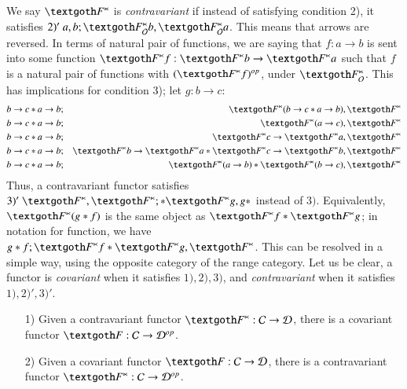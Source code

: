 \documentclass [12pt]{book}
\begin{document}
We say $\textgoth F^{\ltimes}$ is \textit{contravariant} if instead of satisfying condition 2), it satisfies $2)'~a,b;\textgoth F^\ltimes_{\mathcal O}b,\textgoth F^\ltimes_\mathcal Oa$. This means that arrows are reversed. In terms of natural pair of functions, we are saying that $f:a\rightarrow b$ is sent into some function $\textgoth F^\ltimes f:\textgoth F^\ltimes b\rightarrow\textgoth F^\ltimes a$ such that $f$ is a natural pair of functions with $(\textgoth F^\ltimes f)^{op}$, under $\textgoth F^\ltimes_\mathcal O$. This has implications for condition 3); let $g:b\rightarrow c$:\begin{eqnarray}\nonumber b\rightarrow c*a\rightarrow b&;&\textgoth F^\ltimes(b\rightarrow c*a\rightarrow b),\textgoth F^\ltimes\\\nonumber b\rightarrow c*a\rightarrow b&;&\textgoth F^\ltimes(a\rightarrow c),\textgoth F^\ltimes\\\nonumber b\rightarrow c*a\rightarrow b&;&\textgoth F^\ltimes c\rightarrow \textgoth F^\ltimes a,\textgoth F^\ltimes\\\nonumber b\rightarrow c*a\rightarrow b&;&\textgoth F^\ltimes b\rightarrow \textgoth F^\ltimes a*\textgoth F^\ltimes c\rightarrow\textgoth F^\ltimes b,\textgoth F^\ltimes \\\nonumber b\rightarrow c*a\rightarrow b&;&\textgoth F^\ltimes (a\rightarrow b)*\textgoth F^\ltimes (b\rightarrow c),\textgoth F^\ltimes \end{eqnarray}Thus, a contravariant functor satisfies $3)'~\textgoth F^\ltimes ,\textgoth F^\ltimes ;*\textgoth F^\ltimes g,g*$ instead of $3)$. Equivalently, $\textgoth F^\ltimes (g*f)$ is the same object as $\textgoth F^\ltimes f*\textgoth F^\ltimes g$; in notation for function, we have $g*f;\textgoth F^\ltimes f*\textgoth F^\ltimes g,\textgoth F^\ltimes $. This can be resolved in a simple way, using the opposite category of the range category. Let us be clear, a functor is \textit{covariant} when it satisfies $1),2),3)$, and \textit{contravariant} when it satisfies $1),2)',3)'$.

\begin{theorem}\makebox[5pt][]{}\mbox {}\begin{itemize}\item[1)]Given a contravariant functor $\textgoth F^\ltimes:\mathcal C\rightarrow\mathcal D$, there is a covariant functor $\textgoth F:\mathcal C\rightarrow\mathcal D^{op}$.\item[2)]Given a covariant functor $\textgoth F:\mathcal C\rightarrow\mathcal D$, there is a contravariant functor $\textgoth F^\ltimes:\mathcal C\rightarrow\mathcal D^{op}$.\end{itemize}\end{theorem}
\end{document}
